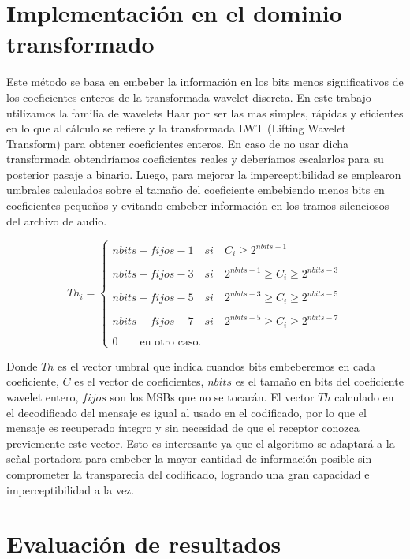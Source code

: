 \documentclass[conference,a4paper,10pt, oneside,final]{tfmpd}
\begin{document}
\section{Implementación en el dominio transformado}
Este método se basa en embeber la información en los bits menos significativos de los coeficientes enteros de la transformada wavelet discreta. 
En este trabajo utilizamos la familia de wavelets Haar por ser las mas simples, rápidas y eficientes en lo que al cálculo se refiere y la transformada LWT (Lifting Wavelet Transform) para obtener coeficientes enteros. En caso de no usar dicha transformada obtendríamos coeficientes reales y deberíamos escalarlos para su posterior pasaje a binario. 
Luego, para mejorar la imperceptibilidad se emplearon umbrales calculados sobre el tamaño del coeficiente embebiendo menos bits en coeficientes pequeños y evitando embeber información en los tramos silenciosos del archivo de audio.

\scriptsize{
$$
Th_i= \left\lbrace 
\begin{array}{ll}
 nbits - fijos -1 \quad si \quad C_i \geq 2^{nbits-1}\\
 \\
nbits - fijos -3 \quad si \quad 2^{nbits-1} \geq C_i \geq 2^{nbits-3} \\
\\
nbits - fijos -5 \quad si \quad 2^{nbits-3} \geq C_i \geq 2^{nbits-5} \\
\\
nbits - fijos -7 \quad si \quad 2^{nbits-5} \geq C_i \geq 2^{nbits-7} \\
\\
0 \qquad  \text{en otro caso.} 
\end{array}
\right.
$$
}

Donde $Th$ es el vector umbral que indica cuandos bits embeberemos en cada coeficiente, $C$ es el vector de coeficientes, $nbits$ es el tamaño en bits del coeficiente wavelet entero, $fijos$ son los MSBs que no se tocarán.
El vector $Th$ calculado en el decodificado del mensaje es igual al usado en el codificado, por lo que el mensaje es recuperado íntegro y sin necesidad de que el receptor conozca previemente este vector. Esto es interesante ya que el algoritmo se adaptará a la señal portadora para embeber la mayor cantidad de información posible sin comprometer la transparecia del codificado, logrando una gran capacidad e imperceptibilidad a la vez.

\section{Evaluación de resultados}
\end{document}
